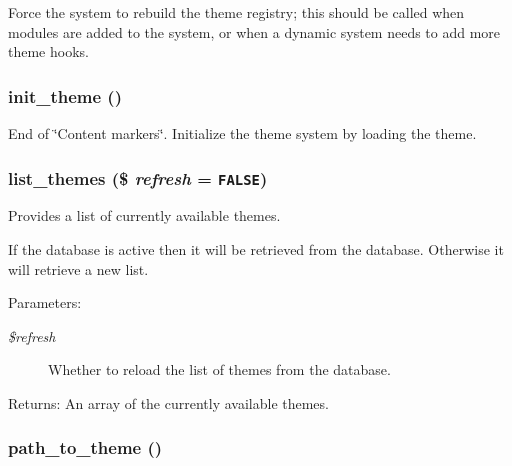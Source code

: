 Force the system to rebuild the theme registry; this should be called when modules are added to the system, or when a dynamic system needs to add more theme hooks. \hypertarget{includes_2theme_8inc_35160721f9c84c9a8f0825db6e7445d1}{
\subsubsection[{init\_\-theme}]{\setlength{\rightskip}{0pt plus 5cm}init\_\-theme ()}}
\label{includes_2theme_8inc_35160721f9c84c9a8f0825db6e7445d1}


End of \char`\"{}Content markers\char`\"{}. Initialize the theme system by loading the theme. \hypertarget{includes_2theme_8inc_48d5521b10139d745626435d804353a4}{
\subsubsection[{list\_\-themes}]{\setlength{\rightskip}{0pt plus 5cm}list\_\-themes (\$ {\em refresh} = {\tt FALSE})}}
\label{includes_2theme_8inc_48d5521b10139d745626435d804353a4}


Provides a list of currently available themes.

If the database is active then it will be retrieved from the database. Otherwise it will retrieve a new list.

\begin{Desc}
\item[Parameters:]
\begin{description}
\item[{\em \$refresh}]Whether to reload the list of themes from the database. \end{description}
\end{Desc}
\begin{Desc}
\item[Returns:]An array of the currently available themes. \end{Desc}
\hypertarget{includes_2theme_8inc_8fd73902b4d3a2d476e5b1324506b5e1}{
\subsubsection[{path\_\-to\_\-theme}]{\setlength{\rightskip}{0pt plus 5cm}path\_\-to\_\-theme ()}}
\label{includes_2theme_8inc_8fd73902b4d3a2d476e5b1324506b5e1}


